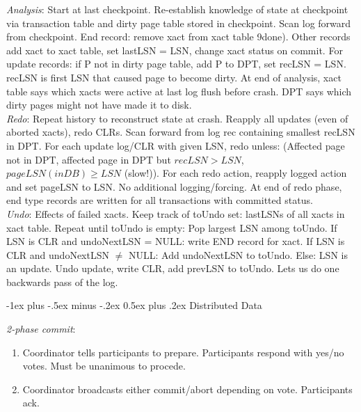 \documentclass[10pt,landscape]{article}
\makeatletter
\renewcommand{\section}{\@startsection{section}{1}{0mm}%
                                {-1ex plus -.5ex minus -.2ex}%
                                {0.5ex plus .2ex}%
                                {\normalfont\large\bfseries}}
\makeatother
\begin{document}
\begin{multicols}{3}
\textit{Analysis}: Start at last checkpoint. Re-establish knowledge of state at checkpoint via transaction table and dirty page table stored in checkpoint. Scan log forward from checkpoint. End record: remove xact from xact table 9done). Other records add xact to xact table, set lastLSN = LSN, change xact status on commit. For update records: if P not in dirty page table, add P to DPT, set recLSN = LSN. recLSN is first LSN that caused page to become dirty. At end of analysis, xact table says which xacts were active at last log flush before crash. DPT says which dirty pages might not have made it to disk. \\
\textit{Redo}: Repeat history to reconstruct state at crash. Reapply all updates (even of aborted xacts), redo CLRs. Scan forward from log rec containing smallest recLSN in DPT. For each update log/CLR with given LSN, redo unless: (Affected page not in DPT, affected page in DPT but $recLSN > LSN$, $pageLSN(inDB) \ge LSN$ (slow!)). For each redo action, reapply logged action and set pageLSN to LSN. No additional logging/forcing. At end of redo phase, end type records are written for all transactions with committed status. \\
\textit{Undo}: Effects of failed xacts. Keep track of toUndo set: lastLSNs of all xacts in xact table. Repeat until toUndo is empty: Pop largest LSN among toUndo. If LSN is CLR and undoNextLSN = NULL: write END record for xact. If LSN is CLR and undoNextLSN $\ne$ NULL: Add undoNextLSN to toUndo. Else: LSN is an update. Undo update, write CLR, add prevLSN to toUndo. Lets us do one backwards pass of the log.


\section{Distributed Data}

\textit{2-phase commit}:

\begin{enumerate}
  \item Coordinator tells participants to prepare. Participants respond with yes/no votes. Must be unanimous to procede.
  \item Coordinator broadcasts either commit/abort depending on vote. Participants ack.
\end{enumerate}





\end{multicols}
\end{document}
